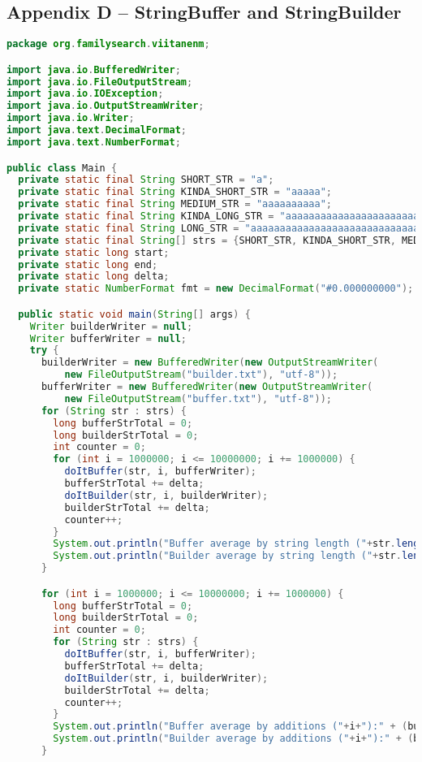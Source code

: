 \subsection*{Appendix D -- StringBuffer and StringBuilder} \label{App:AppendixD}
\begin{lstlisting}[language=Java]
package org.familysearch.viitanenm;

import java.io.BufferedWriter;
import java.io.FileOutputStream;
import java.io.IOException;
import java.io.OutputStreamWriter;
import java.io.Writer;
import java.text.DecimalFormat;
import java.text.NumberFormat;

public class Main {
  private static final String SHORT_STR = "a";
  private static final String KINDA_SHORT_STR = "aaaaa";
  private static final String MEDIUM_STR = "aaaaaaaaaa";
  private static final String KINDA_LONG_STR = "aaaaaaaaaaaaaaaaaaaaaaaaa";
  private static final String LONG_STR = "aaaaaaaaaaaaaaaaaaaaaaaaaaaaaaaaaaaaaaaaaaaaaaaaaa";
  private static final String[] strs = {SHORT_STR, KINDA_SHORT_STR, MEDIUM_STR, KINDA_LONG_STR, LONG_STR};
  private static long start;
  private static long end;
  private static long delta;
  private static NumberFormat fmt = new DecimalFormat("#0.000000000");

  public static void main(String[] args) {
    Writer builderWriter = null;
    Writer bufferWriter = null;
    try {
      builderWriter = new BufferedWriter(new OutputStreamWriter(
          new FileOutputStream("builder.txt"), "utf-8"));
      bufferWriter = new BufferedWriter(new OutputStreamWriter(
          new FileOutputStream("buffer.txt"), "utf-8"));
      for (String str : strs) {
        long bufferStrTotal = 0;
        long builderStrTotal = 0;
        int counter = 0;
        for (int i = 1000000; i <= 10000000; i += 1000000) {
          doItBuffer(str, i, bufferWriter);
          bufferStrTotal += delta;
          doItBuilder(str, i, builderWriter);
          builderStrTotal += delta;
          counter++;
        }
        System.out.println("Buffer average by string length ("+str.length()+"):" + (bufferStrTotal/counter));
        System.out.println("Builder average by string length ("+str.length()+"):" + (builderStrTotal/counter));
      }

      for (int i = 1000000; i <= 10000000; i += 1000000) {
        long bufferStrTotal = 0;
        long builderStrTotal = 0;
        int counter = 0;
        for (String str : strs) {
          doItBuffer(str, i, bufferWriter);
          bufferStrTotal += delta;
          doItBuilder(str, i, builderWriter);
          builderStrTotal += delta;
          counter++;
        }
        System.out.println("Buffer average by additions ("+i+"):" + (bufferStrTotal/counter));
        System.out.println("Builder average by additions ("+i+"):" + (builderStrTotal/counter));
      }


\end{lstlisting}
